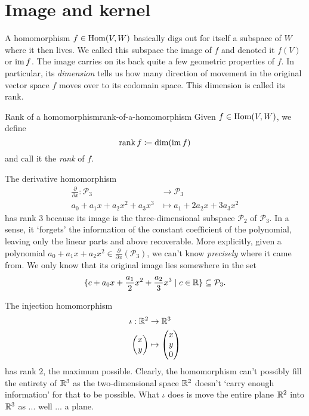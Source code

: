 \section{Image and kernel}
\label{sec:image-and-kernel}

A homomorphism $f \in \operatorname{Hom}(V,W)$ basically digs out for itself a subspace of $W$
where it then lives. We called this subspace the image of $f$ and denoted it
$f(V)$ or $\operatorname{im} f$. The image carries on its back quite a few geometric
properties of $f$. In particular, its \emph{dimension} tells us how many
direction of movement in the original vector space $f$ moves over to its
codomain space. This dimension is called its rank.

\begin{definition}{Rank of a homomorphism}{rank-of-a-homomorphism}
 Given $f \in \operatorname{Hom}(V,W)$, we define
 \[
  \operatorname{rank} f \coloneqq \dim(\operatorname{im} f)
 \]
 and call it the \emph{rank} of $f$.
\end{definition}
\begin{example}{}{}
 The derivative homomorphism
 \begin{align*}
  \frac{\partial }{\partial x}: \mathcal{P}_3 &\to \mathcal{P}_3\\
  a_0 + a_1x + a_2x^2 + a_3x^3 & \mapsto a_1 + 2a_2x + 3a_3x^2
 \end{align*}
 has rank $3$ because its image is the three-dimensional subspace
 $\mathcal{P}_2$ of $\mathcal{P}_3$. In a sense, it `forgets' the information of
 the constant coefficient of the polynomial, leaving only the linear parts and
 above recoverable. More explicitly, given a polynomial $a_0 + a_1x + a_2x^2 \in
 \frac{\partial }{\partial x}(\mathcal{P}_3)$, we can't know \emph{precisely}
 where it came from. We only know that its original image lies somewhere in the
 set
 \[
  \{c + a_0x + \frac{a_1}{2}x^2 + \frac{a_2}{3}x^3 \mid c \in \mathbb{R}\} \subseteq
  \mathcal{P}_3.
 \]
\end{example}
\begin{example}{}{}
 The injection homomorphism
 \begin{align*}
  \iota: \mathbb{R}^2 &\to \mathbb{R}^3\\
  \begin{pmatrix}
   x\\
   y
  \end{pmatrix}
              & \mapsto 
  \begin{pmatrix}
   x\\
   y\\
   0
  \end{pmatrix}
 \end{align*}
 has rank $2$, the maximum possible. Clearly, the homomorphism can't possibly
 fill the entirety of $\mathbb{R}^3$ as the two-dimensional space $\mathbb{R}^2$ doesn't `carry
 enough information' for that to be possible. What $\iota$ does is move the
 entire plane $\mathbb{R}^2$ into $\mathbb{R}^3$ as ... well ... a plane.
\end{example}

